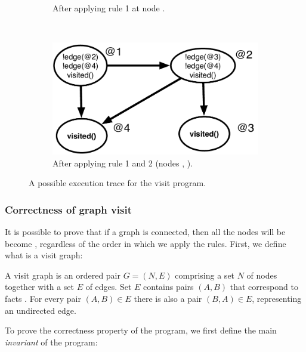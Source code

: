 \begin{figure}[h]
\begin{subfigure}[b]{0.5\textwidth}
                \caption{After applying rule 1 at node .}
                \label{fig:exec_trace3}
        \end{subfigure}%
        ~ %
        \begin{subfigure}[b]{0.5\textwidth}
                  \includegraphics[width=\textwidth]{figures/visit/trace4}
                  \caption{After applying rule 1 and 2 (nodes ,
                        ).}
                  \label{fig:exec_trace4}
          \end{subfigure}
        \caption{A possible execution trace for the visit program.}\label{fig:exec_trace}
\end{figure}

\subsubsection{Correctness of graph visit}

It is possible to prove that if a graph is connected, then all the nodes will be
become , regardless of the order in which we apply the rules.
First, we define what is a visit graph:

\begin{definition}
A visit graph is an ordered pair $G = (N, E)$ comprising a set $N$ of nodes together
with a set $E$ of edges. Set $E$ contains pairs $(A, B)$ that correspond to
facts . For every pair $(A, B) \in E$ there is also a
pair $(B, A) \in E$, representing an undirected edge.
\end{definition}

To prove the correctness property of the program, we first define the main
\emph{invariant} of the program:

